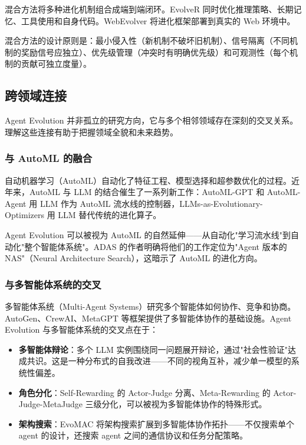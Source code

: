 混合方法将多种进化机制组合成端到端闭环。EvolveR 同时优化推理策略、长期记忆、工具使用和自身代码。WebEvolver 将进化框架部署到真实的 Web 环境中。

混合方法的设计原则是：最小侵入性（新机制不破坏旧机制）、信号隔离（不同机制的奖励信号应独立）、优先级管理（冲突时有明确优先级）和可观测性（每个机制的贡献可独立度量）。

\subsection{跨领域连接}\label{sec:intro-crossdomain}

Agent Evolution 并非孤立的研究方向，它与多个相邻领域存在深刻的交叉关系。理解这些连接有助于把握领域全貌和未来趋势。

\subsubsection{与 AutoML 的融合}

自动机器学习（AutoML）自动化了特征工程、模型选择和超参数优化的过程。近年来，AutoML 与 LLM 的结合催生了一系列新工作：AutoML-GPT 和 AutoML-Agent 用 LLM 作为 AutoML 流水线的控制器，LLMs-as-Evolutionary-Optimizers 用 LLM 替代传统的进化算子。

Agent Evolution 可以被视为 AutoML 的自然延伸——从自动化"学习流水线"到自动化"整个智能体系统"。ADAS 的作者明确将他们的工作定位为"Agent 版本的 NAS"（Neural Architecture Search），这暗示了 AutoML 的进化方向。

\subsubsection{与多智能体系统的交叉}

多智能体系统（Multi-Agent Systems）研究多个智能体如何协作、竞争和协商。AutoGen、CrewAI、MetaGPT 等框架提供了多智能体协作的基础设施。Agent Evolution 与多智能体系统的交叉点在于：

\begin{itemize}
\item \textbf{多智能体辩论}：多个 LLM 实例围绕同一问题展开辩论，通过"社会性验证"达成共识。这是一种分布式的自我改进——不同的视角互补，减少单一模型的系统性偏差。
\item \textbf{角色分化}：Self-Rewarding 的 Actor-Judge 分离、Meta-Rewarding 的 Actor-Judge-MetaJudge 三级分化，可以被视为多智能体协作的特殊形式。
\item \textbf{架构搜索}：EvoMAC 将架构搜索扩展到多智能体协作拓扑——不仅搜索单个 agent 的设计，还搜索 agent 之间的通信协议和任务分配策略。
\end{itemize}

